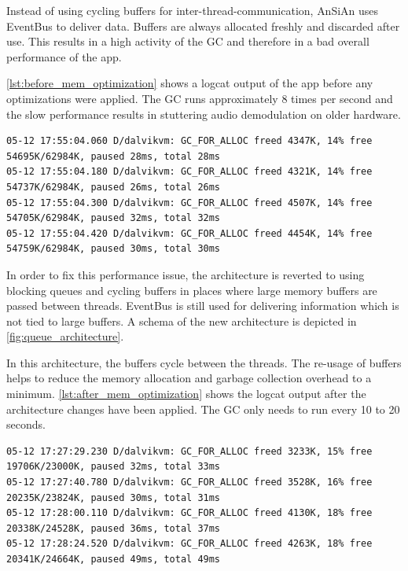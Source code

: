 Instead of using cycling buffers for inter-thread-communication, \ac{AnSiAn} uses
EventBus to deliver data. Buffers are always allocated freshly
and discarded after use. This results in a high activity of the
\ac{GC} and therefore in a bad overall performance of the app.

\autoref{lst:before_mem_optimization} shows a logcat output of the
app before any optimizations were applied. The \ac{GC} runs approximately 8 times per second
and the slow performance results in stuttering audio demodulation on
older hardware.

\begin{lstlisting}[label=lst:before_mem_optimization, caption=Logcat output
before memory optimizations, language=none]
05-12 17:55:04.060 D/dalvikvm: GC_FOR_ALLOC freed 4347K, 14% free 54695K/62984K, paused 28ms, total 28ms
05-12 17:55:04.180 D/dalvikvm: GC_FOR_ALLOC freed 4321K, 14% free 54737K/62984K, paused 26ms, total 26ms
05-12 17:55:04.300 D/dalvikvm: GC_FOR_ALLOC freed 4507K, 14% free 54705K/62984K, paused 32ms, total 32ms
05-12 17:55:04.420 D/dalvikvm: GC_FOR_ALLOC freed 4454K, 14% free 54759K/62984K, paused 30ms, total 30ms
\end{lstlisting}

In order to fix this performance issue, the architecture is reverted
to using blocking queues and cycling buffers in places where large memory buffers are passed
between threads. EventBus is still used for delivering information
which is not tied to large buffers. A schema of the new architecture
is depicted in \autoref{fig:queue_architecture}. 

In this architecture, the buffers cycle between the threads. The re-usage
of buffers helps to reduce the memory allocation and garbage collection
overhead to a minimum. \autoref{lst:after_mem_optimization} shows the
logcat output after the architecture changes have been applied. The \ac{GC}
only needs to run every 10 to 20 seconds.


\begin{lstlisting}[label=lst:after_mem_optimization, caption=Logcat output
after memory optimizations, language=none]
05-12 17:27:29.230 D/dalvikvm: GC_FOR_ALLOC freed 3233K, 15% free 19706K/23000K, paused 32ms, total 33ms
05-12 17:27:40.780 D/dalvikvm: GC_FOR_ALLOC freed 3528K, 16% free 20235K/23824K, paused 30ms, total 31ms
05-12 17:28:00.110 D/dalvikvm: GC_FOR_ALLOC freed 4130K, 18% free 20338K/24528K, paused 36ms, total 37ms
05-12 17:28:24.520 D/dalvikvm: GC_FOR_ALLOC freed 4263K, 18% free 20341K/24664K, paused 49ms, total 49ms
\end{lstlisting}


%
